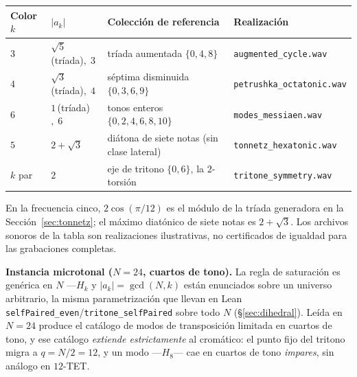 \documentclass[11pt]{article}
\newcommand{\lean}[1]{\texttt{#1}}
\begin{document}
\begin{table}[h]\centering\footnotesize\setlength{\tabcolsep}{5pt}
\begin{tabular}{@{}p{} p{} p{} p{}@{}}
\toprule
\rowcolor{ctA!22}
\textbf{Color $k$} & \textbf{$|a_k|$} & \textbf{Colecci\'on de referencia} & \textbf{Realizaci\'on}\\
\midrule
$3$ & $\sqrt5\,$(tr\'iada)$,\;3$ & tr\'iada aumentada $\{0,4,8\}$ & \lean{augmented\_cycle.wav}\\
$4$ & $\sqrt3\,$(tr\'iada)$,\;4$ & s\'eptima disminuida $\{0,3,6,9\}$ & \lean{petrushka\_octatonic.wav}\\
$6$ & $1\,$(tr\'iada)$,\;6$ & tonos enteros $\{0,2,4,6,8,10\}$ & \lean{modes\_messiaen.wav}\\
$5$ & $2+\sqrt3$ & di\'atona de siete notas (sin clase lateral) & \lean{tonnetz\_hexatonic.wav}\\
$k$ par & $2$ & eje de tritono $\{0,6\}$, la $2$-torsi\'on & \lean{tritone\_symmetry.wav}\\
\bottomrule
\end{tabular}
\end{table}

En la frecuencia cinco, $2\cos(\pi/12)$ es el m\'odulo de la tr\'iada generadora en
la Secci\'on~\ref{sec:tonnetz}; el m\'aximo diat\'onico de siete notas es $2+\sqrt3$.
Los archivos sonoros de la tabla son realizaciones ilustrativas, no certificados de igualdad
para las grabaciones completas.

\textbf{Instancia microtonal ($N=24$, cuartos de tono).} La regla de saturaci\'on es gen\'erica en $N$ ---$H_k$
y $|a_k|=\gcd(N,k)$ est\'an enunciados sobre un universo arbitrario, la misma parametrizaci\'on que llevan en
Lean \lean{selfPaired\_even}/\lean{tritone\_selfPaired} sobre todo $N$ (\S\ref{sec:dihedral}). Le\'ida en
$N=24$ produce el cat\'alogo de modos de transposici\'on limitada en cuartos de tono, y ese cat\'alogo
\emph{extiende estrictamente} al crom\'atico: el punto fijo del tritono migra a $q=N/2=12$, y un modo ---$H_8$---
cae en cuartos de tono \emph{impares}, sin an\'alogo en $12$-TET.
\end{document}
